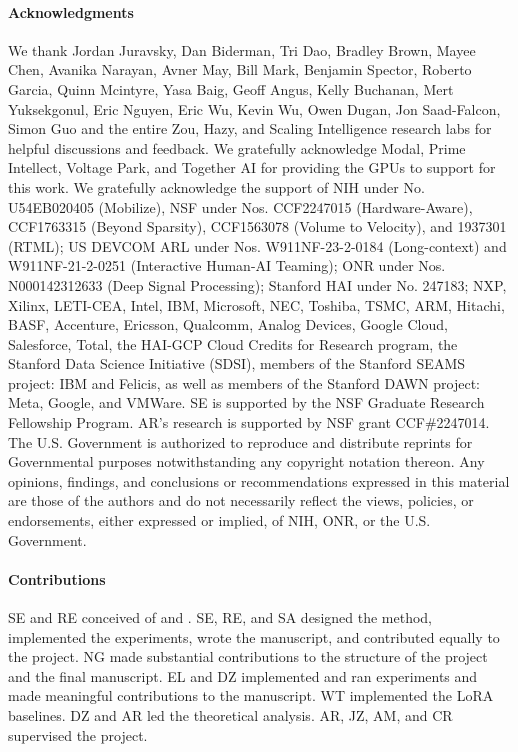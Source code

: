 \paragraph{Acknowledgments} We thank Jordan Juravsky, Dan Biderman, Tri Dao, Bradley Brown, Mayee Chen, Avanika Narayan, Avner May, Bill Mark, Benjamin Spector, Roberto Garcia, Quinn Mcintyre, Yasa Baig, Geoff Angus, Kelly Buchanan, Mert Yuksekgonul, Eric Nguyen, Eric Wu, Kevin Wu, Owen Dugan, Jon Saad-Falcon, Simon Guo and the entire Zou, Hazy, and Scaling Intelligence research labs for helpful discussions and feedback.
We gratefully acknowledge Modal, Prime Intellect, Voltage Park, and Together AI for providing the GPUs to support for this work.
We gratefully acknowledge the support of NIH under No. U54EB020405 (Mobilize), NSF under Nos. CCF2247015 (Hardware-Aware), CCF1763315 (Beyond Sparsity), CCF1563078 (Volume to Velocity), and 1937301 (RTML); US DEVCOM ARL under Nos. W911NF-23-2-0184 (Long-context) and W911NF-21-2-0251 (Interactive Human-AI Teaming); ONR under Nos. N000142312633 (Deep Signal Processing); Stanford HAI under No. 247183; NXP, Xilinx, LETI-CEA, Intel, IBM, Microsoft, NEC, Toshiba, TSMC, ARM, Hitachi, BASF, Accenture, Ericsson, Qualcomm, Analog Devices, Google Cloud, Salesforce, Total, the HAI-GCP Cloud Credits for Research program,  the Stanford Data Science Initiative (SDSI), members of the Stanford SEAMS project: IBM and Felicis, as well as members of the Stanford DAWN project: Meta, Google, and VMWare. SE is supported by the NSF Graduate Research Fellowship Program. AR's research is supported by NSF grant CCF\#2247014. The U.S. Government is authorized to reproduce and distribute reprints for Governmental purposes notwithstanding any copyright notation thereon. Any opinions, findings, and conclusions or recommendations expressed in this material are those of the authors and do not necessarily reflect the views, policies, or endorsements, either expressed or implied, of NIH, ONR, or the U.S. Government.
\paragraph{Contributions}
SE and RE conceived of \artifacts and \method. SE, RE, and SA designed the method, implemented the experiments, wrote the manuscript, and contributed equally to the project. NG made substantial contributions to the structure of the project and the final manuscript. EL and DZ implemented and ran experiments and made meaningful contributions to the manuscript.
WT implemented the LoRA baselines.
DZ and AR led the theoretical analysis.
AR, JZ, AM, and CR supervised the project.


